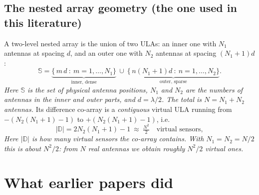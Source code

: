 \documentclass[11pt]{article}
\begin{document}
\subsection{The nested array geometry (the one used in this literature)}
A two-level nested array is the union of two ULAs: an inner one with $N_{1}$ antennas at spacing $d$,
and an outer one with $N_{2}$ antennas at spacing $(N_{1}+1)d$ \cite{pal2010nested}:
\begin{equation}
\mathbb{S}=\underbrace{\{\,m\,d\ :\ m=1,\dots,N_{1}\}}_{\text{inner, dense}}\ \cup\
\underbrace{\{\,n(N_{1}+1)d\ :\ n=1,\dots,N_{2}\}}_{\text{outer, sparse}} .
\label{eq:nested}
\end{equation}
\textit{Here $\mathbb{S}$ is the set of physical antenna positions, $N_{1}$ and $N_{2}$ are the
numbers of antennas in the inner and outer parts, and $d=\lambda/2$. The total is $N=N_{1}+N_{2}$
antennas.} Its difference co-array is a \emph{contiguous} virtual ULA running from
$-(N_{2}(N_{1}+1)-1)$ to $+(N_{2}(N_{1}+1)-1)$, i.e.
\begin{equation}
|\mathbb{D}|=2N_{2}(N_{1}+1)-1\ \approx\ \tfrac{N^{2}}{2}\quad\text{virtual sensors},
\label{eq:dof}
\end{equation}
\textit{Here $|\mathbb{D}|$ is how many virtual sensors the co-array contains. With
$N_{1}=N_{2}=N/2$ this is about $N^{2}/2$: from $N$ real antennas we obtain roughly $N^{2}/2$ virtual
ones.}

\begin{center}
\end{center}

\section{What earlier papers did}
\end{document}
